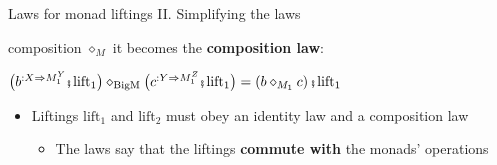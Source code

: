 \documentclass[english]{beamer}
\newcommand{\bef}{\hspace{0.5pt}\ensuremath\mathsmaller{\fatsemi}\hspace{1.5pt}}
\begin{document}
\begin{frame}{Laws for monad liftings II. Simplifying the laws}
\begin{itemize}
composition $\diamond_{M}$ it becomes the \textbf{composition law}:
\end{itemize}
\begin{center}
{\footnotesize{}\vspace{-0.2cm}\hspace{-0.0cm}$\big(b^{:X\Rightarrow M_{1}^{Y}}\bef\text{lift}_{1}\big)\diamond_{\text{BigM}}\big(c^{:Y\Rightarrow M_{1}^{Z}}\bef\text{lift}_{1}\big)=\left(b\diamond_{M_{1}}c\right)\bef\text{lift}_{1}$}{\footnotesize\par}
\par\end{center}
\begin{itemize}
\item {\footnotesize{}\vspace{-0.3cm}\hspace{-0.0cm}}Liftings $\text{lift}_{1}$
and $\text{lift}_{2}$ must obey an identity law and a composition
law
\begin{itemize}
\item The laws say that the liftings \textbf{commute with} the monads' operations
\end{itemize}
\end{itemize}
\end{frame}
\end{document}
